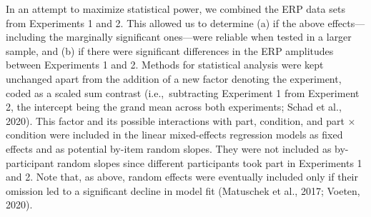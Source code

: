 \documentclass[
  english,
  doc,12pt,twoside,floatsintext]{apa7}
\begin{document}
In an attempt to maximize statistical power, we combined the ERP data sets from Experiments 1 and 2. This allowed us to determine (a) if the above effects---including the marginally significant ones---were reliable when tested in a larger sample, and (b) if there were significant differences in the ERP amplitudes between Experiments 1 and 2. Methods for statistical analysis were kept unchanged apart from the addition of a new factor denoting the experiment, coded as a scaled sum contrast (i.e.,~subtracting Experiment 1 from Experiment 2, the intercept being the grand mean across both experiments; Schad et al., 2020). This factor and its possible interactions with part, condition, and part × condition were included in the linear mixed-effects regression models as fixed effects and as potential by-item random slopes. They were not included as by-participant random slopes since different participants took part in Experiments 1 and 2. Note that, as above, random effects were eventually included only if their omission led to a significant decline in model fit (Matuschek et al., 2017; Voeten, 2020).
\end{document}
